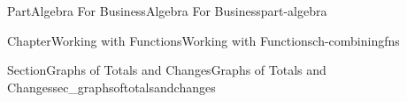 \documentclass{tufte-book}
\numberwithin{equation}{chapter}
\def \tikzhistogram (#1,#2){\draw[fill=blue,opacity=0.3] ({#1+((\xtwo-\xmin)/5)},#2) rectangle ({#1-((\xtwo-\xmin)/5)},0); \draw[draw,thick] ({#1+((\xtwo-\xmin)/5)},#2) rectangle ({#1-((\xtwo-\xmin)/5)},0); \node[draw,fill=blue, circle,inner sep=2.5pt] at (#1,#2) {};}
\begin{document}
\begin{partptx}{Part}{Algebra For Business}{}{Algebra For Business}{}{}{part-algebra}
\begin{chapterptx}{Chapter}{Working with Functions}{}{Working with Functions}{}{}{ch-combiningfns}
\begin{sectionptx}{Section}{\textasteriskcentered{}Graphs of Totals and Changes}{}{\textasteriskcentered{}Graphs of Totals and Changes}{}{}{sec_graphsoftotalsandchanges}
\begin{image}{0}{1}{0}{}
{                    %
                    \def \tikzhistogram (#1,#2){\draw[fill=blue,opacity=0.3] ({#1+0.45},#2) rectangle ({#1-0.45},0); \draw[draw,thick] ({#1+0.45},#2) rectangle ({#1-0.45},0); \node[draw,fill=blue, circle,inner sep=2pt] at (#1,#2) {};}
                    \def \xmin {0}
                    \def \xmax {7}
                    \def \xunits {day}
                    \def \yunits {cost}
                    \def \dyunits{change in cost}
                    \def \ymin {0}								%
                    \def \ysecondmajoraxis {1}		%
                    \def \yfirstminoraxis  {0.5}	%
                    \def \ysecondminoraxis {1.5}	%
                    \def \ymax {6}
                    \def \dymin {-3}
                    \def \dysecondmajoraxis {-2}
                    \def \dyfirstminoraxis  {-2.5}
                    \def \dysecondminoraxis {-1.5}
                    \def \dymax {3}
                    \def \xscale {0.8*0.8}
                    \def \dyscale {0.6}
                    }
\end{image}
\end{sectionptx}
\end{chapterptx}
\end{partptx}
\end{document}
